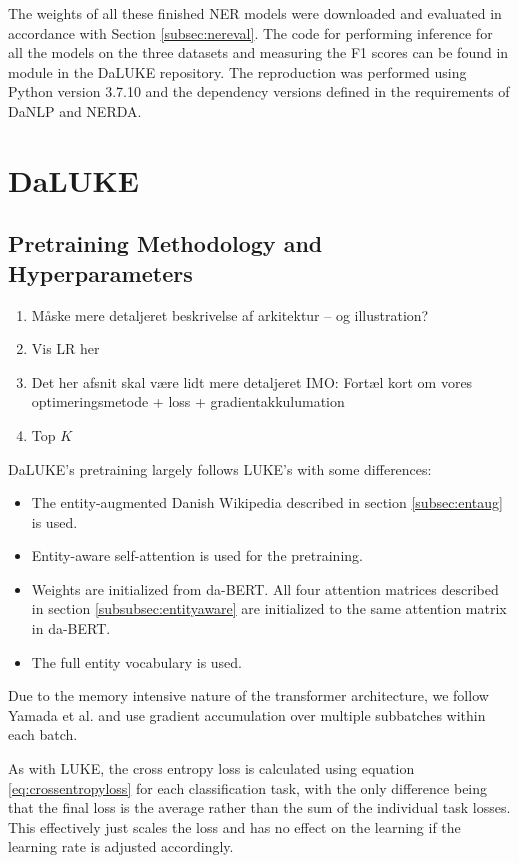 \documentclass[main.tex]{subfiles}
\begin{document}
\noindent
The weights of all these finished NER models were downloaded and evaluated in accordance with Section \ref{subsec:nereval}.
The code for performing inference for all the models on the three datasets and measuring the F1 scores can be found in module  in the DaLUKE repository\footnotemark.
The reproduction was performed using Python version 3.7.10 and the dependency versions defined in the requirements of DaNLP and NERDA.
\section{DaLUKE}

\subsection{Pretraining Methodology and Hyperparameters}%
\label{sub:dalpre}
\begin{enumerate}
    \item Måske mere detaljeret beskrivelse af arkitektur -- og illustration?
    \item Vis LR her
    \item Det her afsnit skal være lidt mere detaljeret IMO: Fortæl kort om vores optimeringsmetode + loss + gradientakkulumation
    \item Top $K$
\end{enumerate}
DaLUKE's pretraining largely follows LUKE's with some differences:
\begin{itemize}
    \item The entity-augmented Danish Wikipedia described in section \ref{subsec:entaug} is used.
    \item Entity-aware self-attention is used for the pretraining.
    \item Weights are initialized from da-BERT.
    All four attention matrices described in section \ref{subsubsec:entityaware} are initialized to the same attention matrix in da-BERT.
    \item The full entity vocabulary is used.
\end{itemize}
Due to the memory intensive nature of the transformer architecture, we follow Yamada et al. and use gradient accumulation over multiple subbatches within each batch.

As with LUKE, the cross entropy loss is calculated using equation \ref{eq:crossentropyloss} for each classification task, with the only difference being that the final loss is the average rather than the sum of the individual task losses.
This effectively just scales the loss and has no effect on the learning if the learning rate is adjusted accordingly.
\end{document}
